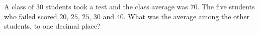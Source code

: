 A class of $30$ students took a test and the class average was $70$. The five students who failed scored $20$, $25$, $25$, $30$ and $40$. What was the average among the other students, to one decimal place?
